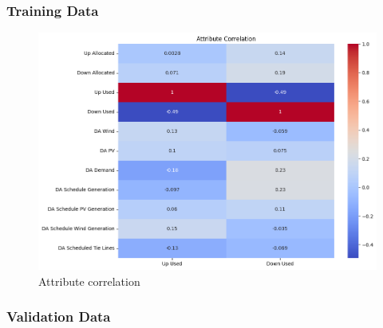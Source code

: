 \subsubsection{Training Data}





\begin{figure}[H]
    \centering
    \includegraphics[width=\textwidth]{plots/correlation_heatmap.png}
    \caption{Attribute correlation}
    \label{fig:Attribute_correlation}
  \end{figure}
  
  
  

\subsubsection{Validation Data}



% 


